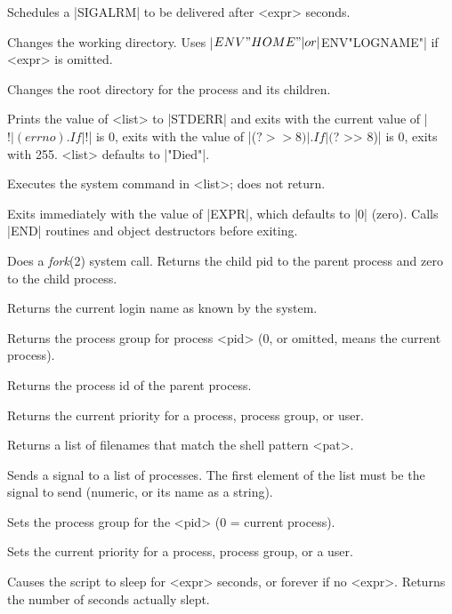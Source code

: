 \begin{enum}{1cm}

Schedules a |SIGALRM| to be delivered after <expr> seconds. 

Changes the working directory.
Uses |$ENV{"HOME"}| or |$ENV{"LOGNAME"}| if <expr> is omitted.

Changes the root directory for the process and its children.

Prints the value of <list> to |STDERR| and exits with the current
value of |$!| (errno). If |$!| is 0, exits with the value of |($? >> 8)|.
If |($? >> 8)| is 0, exits with 255. <list> defaults to
|"Died"|.

Executes the system command in <list>; does not return.

Exits immediately with the value of |EXPR|, which defaults to |0| (zero).
Calls |END| routines and object destructors before exiting.

Does a {\it fork\/}(2) system call. Returns the child pid to the parent
process and zero to the child process. 

Returns the current login name as known by the system.

Returns the process group for process <pid> (0, or omitted,  means the
current process). 

Returns the process id of the parent process.

Returns the current priority for a process, process group, or user.

Returns a list of filenames that match the shell pattern <pat>.

Sends a signal to a list of processes. The first element of the list
must be the signal to send (numeric, or its name as a string). 

Sets the process group for the <pid> (0 = current process).

Sets the current priority for a process, process group, or a user.

Causes the script to sleep for <expr> seconds, or forever if no
<expr>. Returns the number of seconds actually slept. 


\end{enum}

